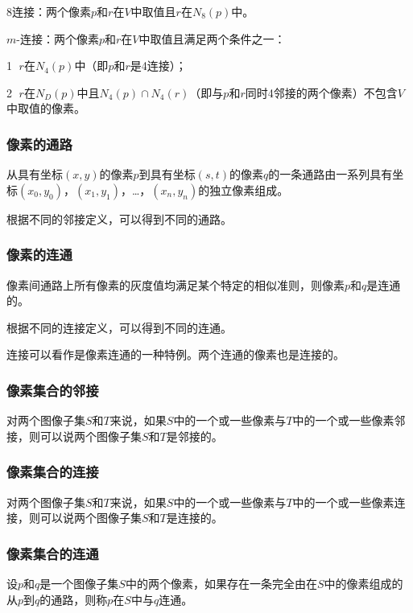 \documentclass[cn, blue, normal, 12pt]{elegantnote}
\begin{document}
8连接：两个像素$p$和$r$在$V$中取值且$r$在$N_8(p)$中。

$m$-连接：两个像素$p$和$r$在$V$中取值且满足两个条件之一：

\textcircled{1} $r$在$N_4(p)$中（即$p$和$r$是4连接）；

\textcircled{2} $r$在$N_D(p)$中且$N_4(p)∩N_4(r)$（即与$p$和$r$同时4邻接的两个像素）不包含$V$中取值的像素。

\subsubsection{像素的通路}

从具有坐标$(x, y)$的像素$p$到具有坐标$(s, t)$的像素$q$的一条通路由一系列具有坐标$(x_0, y_0)$，$(x_1, y_1)$，…，$(x_n, y_n)$的独立像素组成。

根据不同的邻接定义，可以得到不同的通路。

\subsubsection{像素的连通}

像素间通路上所有像素的灰度值均满足某个特定的相似准则，则像素$p$和$q$是连通的。

根据不同的连接定义，可以得到不同的连通。

连接可以看作是像素连通的一种特例。两个连通的像素也是连接的。

\subsubsection{像素集合的邻接}

对两个图像子集$S$和$T$来说，如果$S$中的一个或一些像素与$T$中的一个或一些像素邻接，则可以说两个图像子集$S$和$T$是邻接的。

\subsubsection{像素集合的连接}

对两个图像子集$S$和$T$来说，如果$S$中的一个或一些像素与$T$中的一个或一些像素连接，则可以说两个图像子集$S$和$T$是连接的。

\subsubsection{像素集合的连通}

设$p$和$q$是一个图像子集$S$中的两个像素，如果存在一条完全由在$S$中的像素组成的从$p$到$q$的通路，则称$p$在$S$中与$q$连通。
\end{document}

